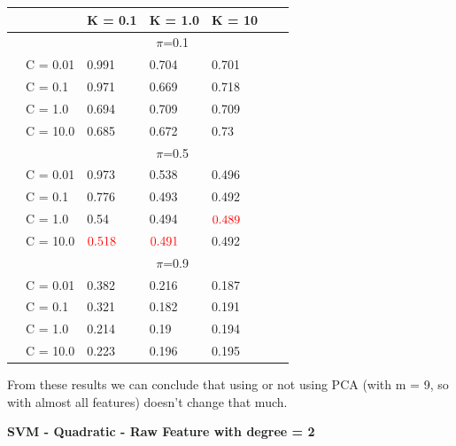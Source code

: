 \documentclass[english]{report}
\begin{document}
\begin{table}[H]
    \centering
    \begin{tabular}{ll|lllll}
        \hline
                                & &         K = 0.1 & K = 1.0 & K = 10 \\ \hline
                                & & \multicolumn{3}{c}{$\pi$=0.1} \\ \hline
                                & C = 0.01   & 0.991 & 0.704 & 0.701    \\
                                & C = 0.1    & 0.971 & 0.669 & 0.718  \\
                                & C = 1.0    & 0.694 & 0.709 & 0.709    \\
                                & C = 10.0   & 0.685 & 0.672 & 0.73  \\ \hline

                                & & \multicolumn{3}{c}{$\pi$=0.5} \\ \hline
                                & C = 0.01   & 0.973 & 0.538 & 0.496   \\
                                & C = 0.1    & 0.776 & 0.493 & 0.492  \\
                                & C = 1.0    & 0.54 & 0.494 & $\color{red}0.489$    \\
                                & C = 10.0   & $\color{red}0.518$ & $\color{red}0.491$ & 0.492  \\ \hline

                                & & \multicolumn{3}{c}{$\pi$=0.9} \\ \hline
                                & C = 0.01   & 0.382 & 0.216 & 0.187  \\
                                & C = 0.1    & 0.321 & 0.182 & 0.191  \\
                                & C = 1.0    & 0.214 & 0.19 & 0.194    \\
                                & C = 10.0   & 0.223 & 0.196 & 0.195  \\ 
    \hline
    \end{tabular}
    \label{tab:LinearSVM_PCA9_valid}
\end{table}

From these results we can conclude that using or not using PCA (with m = 9, so with almost all
features) doesn't change that much.

\newpage
\textbf{SVM - Quadratic - Raw Feature with degree = 2}
\end{document}
